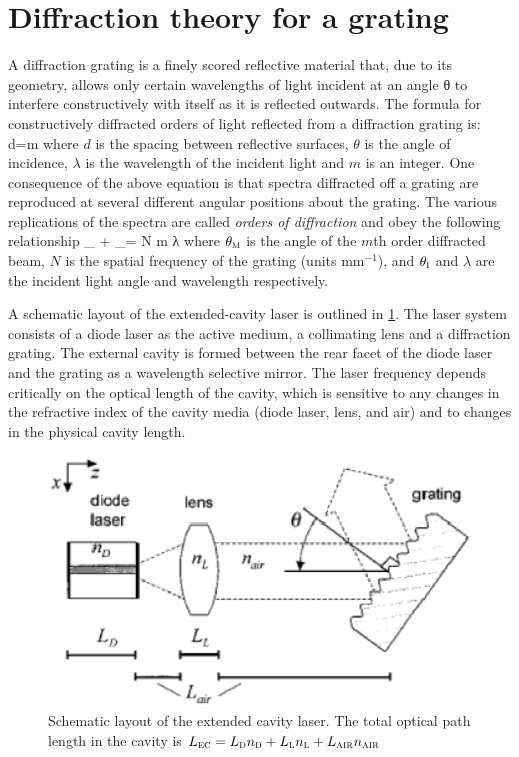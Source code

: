 	\section{Diffraction theory for a grating}\label{gratingtheory}
A diffraction grating is a finely scored reflective material that, due to its geometry, allows only certain wavelengths of light incident at an angle θ to interfere constructively with itself as it is reflected outwards. The formula for constructively diffracted orders of light reflected from a diffraction grating is:
\mate
d\sin\theta=m\lambda
\atem
where $d$ is the spacing between reflective surfaces, $\theta$ is the angle of incidence, $\lambda$ is the wavelength of the incident light and $m$ is an integer. One consequence of the above equation is that spectra diffracted off a grating are reproduced at several different angular positions about the grating. The various replications of the spectra are called \textit{orders of diffraction} and obey the following relationship 
\mate
\sin\theta_{} + \sin\theta_{}= N m λ
\atem
where $\theta_{\mbox{\footnotesize{\scshape{m}}}}$ is the angle of the $m$th order diffracted beam, $N$ is the spatial frequency of the grating (units mm$^{-1}$), and $\theta_{\mbox{\footnotesize{\scshape{i}}}}$ and $\lambda$ are the incident light angle and wavelength respectively.

A schematic layout of the extended-cavity laser is outlined in \cref{grating}. The laser system consists of a diode laser as the active medium, a collimating lens and a diffraction grating. The external cavity is formed between the rear facet of the diode laser and the grating as a wavelength selective mirror. The laser frequency depends critically on the optical length of the cavity, which is sensitive to any changes in the refractive index of the cavity media (diode laser, lens, and air) and to changes in the physical cavity length.

\begin{figure}[!hbt]\centering
\includegraphics[width=\linewidth, draft=\foto]{eps/littrow1.eps}
\caption{Schematic layout of the extended cavity laser. The total optical path length in the cavity is $L_{\mbox{\footnotesize{\scshape{ec}}}}=L_{\mbox{\footnotesize{\scshape{d}}}}n_{\mbox{\footnotesize{\scshape{d}}}}+L_{\mbox{\footnotesize{\scshape{l}}}}n_{\mbox{\footnotesize{\scshape{l}}}}+L_{\mbox{\footnotesize{\scshape{air}}}}n_{\mbox{\footnotesize{\scshape{air}}}}$}
\label{grating}
\end{figure}

